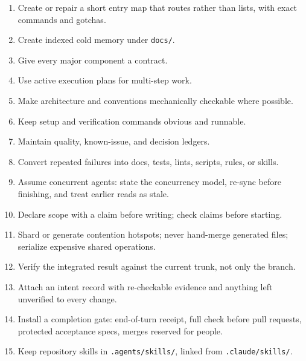 \documentclass[11pt]{article}
\begin{document}
\begin{enumerate}[leftmargin=*]
  \item Create or repair a short entry map that routes rather than lists, with exact commands and gotchas.
  \item Create indexed cold memory under \texttt{docs/}.
  \item Give every major component a contract.
  \item Use active execution plans for multi-step work.
  \item Make architecture and conventions mechanically checkable where possible.
  \item Keep setup and verification commands obvious and runnable.
  \item Maintain quality, known-issue, and decision ledgers.
  \item Convert repeated failures into docs, tests, lints, scripts, rules, or skills.
  \item Assume concurrent agents: state the concurrency model, re-sync before finishing, and treat earlier reads as stale.
  \item Declare scope with a claim before writing; check claims before starting.
  \item Shard or generate contention hotspots; never hand-merge generated files; serialize expensive shared operations.
  \item Verify the integrated result against the current trunk, not only the branch.
  \item Attach an intent record with re-checkable evidence and anything left unverified to every change.
  \item Install a completion gate: end-of-turn receipt, full check before pull requests, protected acceptance specs, merges reserved for people.
  \item Keep repository skills in \texttt{.agents/skills/}, linked from \texttt{.claude/skills/}.
\end{enumerate}
\end{document}
